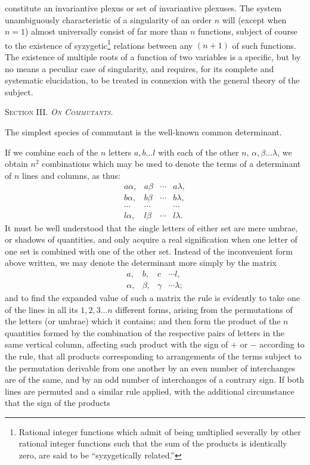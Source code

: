 \documentclass[11pt]{article}
\newcommand{\sourcepage}[1]{\marginpar{\scriptsize p.~#1}}
\begin{document}
{{\sourcepage{305}
constitute an invariantive plexus or set of invariantive plexuses. The system unambiguously characteristic of a singularity of an order $n$ will (except when $n=1$) almost universally consist of far more than $n$ functions, subject of course to the existence of syzygetic\footnote{Rational integer functions which admit of being multiplied severally by other rational integer functions such that the sum of the products is identically zero, are said to be ``syzygetically related.''} relations between any $(n+1)$ of such functions. The existence of multiple roots of a function of two variables is a specific, but by no means a peculiar case of singularity, and requires, for its complete and systematic elucidation, to be treated in connexion with the general theory of the subject.

\begin{center}
{\scshape Section III. \emph{On Commutants.}}
\end{center}

The simplest species of commutant is the well-known common determinant.

If we combine each of the $n$ letters $a,b\ldots l$ with each of the other $n$, $\alpha,\beta\ldots\lambda$, we obtain $n^2$ combinations which may be used to denote the terms of a determinant of $n$ lines and columns, as thus:
\[
\begin{array}{cccc}
a\alpha,&a\beta&\cdots&a\lambda,\\
b\alpha,&b\beta&\cdots&b\lambda,\\
\cdots&\cdots&&\cdots\\
l\alpha,&l\beta&\cdots&l\lambda.
\end{array}
\]
It must be well understood that the single letters of either set are mere umbrae, or shadows of quantities, and only acquire a real signification when one letter of one set is combined with one of the other set. Instead of the inconvenient form above written, we may denote the determinant more simply by the matrix
\[
\begin{array}{cccc}a,&b,&c&\cdots l,\\ \alpha,&\beta,&\gamma&\cdots\lambda;\end{array}
\]
and to find the expanded value of such a matrix the rule is evidently to take one of the lines in all its $1,2,3\ldots n$ different forms, arising from the permutations of the letters (or umbrae) which it contains; and then form the product of the $n$ quantities formed by the combination of the respective pairs of letters in the same vertical column, affecting such product with the sign of $+$ or $-$ according to the rule, that all products corresponding to arrangements of the terms subject to the permutation derivable from one another by an even number of interchanges are of the same, and by an odd number of interchanges of a contrary sign. If both lines are permuted and a similar rule applied, with the additional circumstance that the sign of the products

}}
\end{document}
